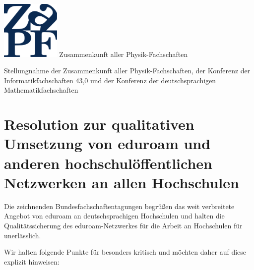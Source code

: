 \documentclass[DIV=calc]{scrartcl}
\begin{document}
\begin{adjustbox}{center}
\begin{minipage}{1.2\textwidth}
\begin{minipage}[c]{0.25\textwidth}
	\end{minipage}
	\hfill
	\begin{minipage}{4cm}
		\begin{minipage}{120pt}
			\vspace{-1.8cm}
			\includegraphics[width=80pt]{../../logo.pdf}
			\centering
			\small Zusammenkunft aller Physik-Fachschaften
		\end{minipage}
	\end{minipage}
\end{minipage}
\end{adjustbox}
\vspace{0.3cm}
\begin{center}
\huge{Stellungnahme der Zusammenkunft aller Physik-Fachschaften, der Konferenz
der Informatikfachschaften 43,0 und der Konferenz der deutschsprachigen Mathematikfachschaften} \\
\normalsize
\end{center}

\vspace{0.4cm}
\section*{Resolution zur qualitativen Umsetzung von  eduroam und anderen
hochschulöffentlichen Netzwerken an allen Hochschulen}

Die zeichnenden Bundesfachschaftentagungen begrüßen das weit verbreitete
Angebot von eduroam an deutschsprachigen Hochschulen und halten die
Qualitätssicherung des eduroam-Netzwerkes für die Arbeit an Hochschulen für
unerlässlich.

Wir halten folgende Punkte für besonders kritisch und möchten daher auf diese
explizit hinweisen:
\end{document}
